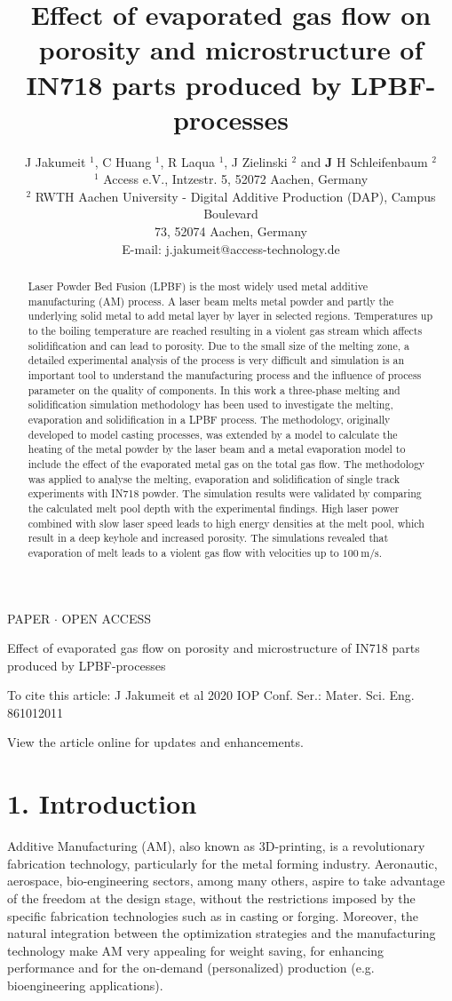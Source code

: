 \documentclass[10pt]{article}
\title{Effect of evaporated gas flow on porosity and microstructure of IN718 parts produced by LPBF-processes }
\author{J Jakumeit $^{1}$, C Huang ${ }^{1}$, R Laqua ${ }^{1}$, J Zielinski ${ }^{2}$ and $\mathbf{J}$ H Schleifenbaum ${ }^{2}$\\
${ }^{1}$ Access e.V., Intzestr. 5, 52072 Aachen, Germany\\
${ }^{2}$ RWTH Aachen University - Digital Additive Production (DAP), Campus Boulevard\\
73, 52074 Aachen, Germany\\
E-mail: j.jakumeit@access-technology.de}
\date{}
\begin{document}
\maketitle
PAPER $\cdot$ OPEN ACCESS

Effect of evaporated gas flow on porosity and microstructure of IN718 parts produced by LPBF-processes

To cite this article: J Jakumeit et al 2020 IOP Conf. Ser.: Mater. Sci. Eng. 861012011

View the article online for updates and enhancements.



\begin{abstract}
Laser Powder Bed Fusion (LPBF) is the most widely used metal additive manufacturing (AM) process. A laser beam melts metal powder and partly the underlying solid metal to add metal layer by layer in selected regions. Temperatures up to the boiling temperature are reached resulting in a violent gas stream which affects solidification and can lead to porosity. Due to the small size of the melting zone, a detailed experimental analysis of the process is very difficult and simulation is an important tool to understand the manufacturing process and the influence of process parameter on the quality of components. In this work a three-phase melting and solidification simulation methodology has been used to investigate the melting, evaporation and solidification in a LPBF process. The methodology, originally developed to model casting processes, was extended by a model to calculate the heating of the metal powder by the laser beam and a metal evaporation model to include the effect of the evaporated metal gas on the total gas flow. The methodology was applied to analyse the melting, evaporation and solidification of single track experiments with IN718 powder. The simulation results were validated by comparing the calculated melt pool depth with the experimental findings. High laser power combined with slow laser speed leads to high energy densities at the melt pool, which result in a deep keyhole and increased porosity. The simulations revealed that evaporation of melt leads to a violent gas flow with velocities up to $100 \mathrm{~m} / \mathrm{s}$.
\end{abstract}

\section*{1. Introduction}
Additive Manufacturing (AM), also known as 3D-printing, is a revolutionary fabrication technology, particularly for the metal forming industry. Aeronautic, aerospace, bio-engineering sectors, among many others, aspire to take advantage of the freedom at the design stage, without the restrictions imposed by the specific fabrication technologies such as in casting or forging. Moreover, the natural integration between the optimization strategies and the manufacturing technology make AM very appealing for weight saving, for enhancing performance and for the on-demand (personalized) production (e.g. bioengineering applications).
\end{document}
